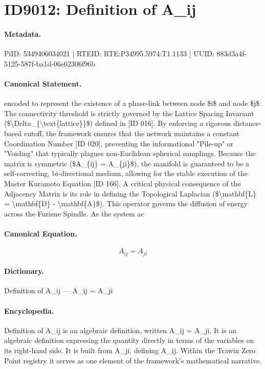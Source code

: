 \section*{ID9012: Definition of A\_ij}
\paragraph{Metadata.}
PiID: 5349406034021 | RTEID: RTE:P34995.5974:T1.1133 | UUID: 883d3a4f-5125-587f-ba1d-06e62306f96b

\paragraph{Canonical Statement.}
encoded to represent the existence of a phase-link between node \$i\$ and node \$j\$. The connectivity threshold is strictly governed by the Lattice Spacing Invariant (\$\textbackslash{}Delta\_\{\textbackslash{}text\{lattice\}\}\$) defined in [ID 016]. By enforcing a rigorous distance-based cutoff, the framework ensures that the network maintains a constant Coordination Number [ID 020], preventing the informational "Pile-up" or "Voiding" that typically plagues non-Euclidean spherical samplings. Because the matrix is symmetric (\$A\_\{ij\} = A\_\{ji\}\$), the manifold is guaranteed to be a self-correcting, bi-directional medium, allowing for the stable execution of the Master Kuramoto Equation [ID 166]. A critical physical consequence of the Adjacency Matrix is its role in defining the Topological Laplacian (\$\textbackslash{}mathbf\{L\} = \textbackslash{}mathbf\{D\} - \textbackslash{}mathbf\{A\}\$). This operator governs the diffusion of energy across the Furiene Spindle. As the system ac

\paragraph{Canonical Equation.}
\[
A_{ij} = A_{ji}
\]

\paragraph{Dictionary.}
Definition of A\_ij — A\_ij = A\_ji

\paragraph{Encyclopedia.}
Definition of A\_ij is an algebraic definition, written A\_ij = A\_ji. It is an algebraic definition expressing the quantity directly in terms of the variables on its right-hand side. It is built from A\_ji, defining A\_ij. Within the Trawin Zero Point registry it serves as one element of the framework's mathematical narrative.
